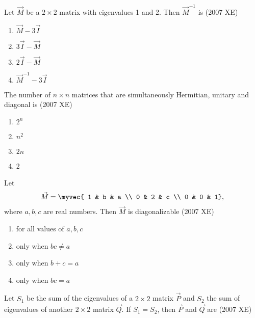     \item Let $\vec{M}$  be a $2 \times 2$ matrix with eigenvalues 1 and 2. Then  $ \vec{M}^{-1}$ is
    \hfill{(2007 XE)}
    \begin{multicols}{4}
    \begin{enumerate}
        \item $\vec{M} - 3\vec{I}$
        \item $3\vec{I} - \vec{M}$
        \item $2\vec{I} - \vec{M}$
        \item $\vec{M}^{-1} - 3\vec{I}$
    \end{enumerate}
\end{multicols}
    \item The number of $n \times n$ matrices that are simultaneously Hermitian, unitary and diagonal is
    \hfill{(2007 XE)}
    \begin{multicols}{4}
    \begin{enumerate}
        \item $2^n$
        \item $n^2$
        \item $2n$
        \item 2
    \end{enumerate}
    \end{multicols}
    \item Let $$\vec{M} = \myvec{ 1 & b & a \\ 0 & 2 & c \\ 0 & 0 & 1},$$ where  $a, b, c$ are real numbers. Then $\vec{M}$ is diagonalizable
    \hfill{(2007 XE)}
    \begin{multicols}{2}
    \begin{enumerate}
        \item for all values of $a, b, c$
        \item only when $bc \neq a$
        \item only when $b + c = a$ 
        \item only when $bc = a$
    \end{enumerate}
\end{multicols}
    \item Let $S_1$ be the sum of the eigenvalues of a $2 \times 2$ matrix $\vec{P}$ and $S_2$ the sum of eigenvalues of another $2 \times 2$ matrix $\vec{Q}$. If $S_1 = S_2$, then $\vec{P}$ and $\vec{Q}$  are
    \hfill{(2007 XE)}

